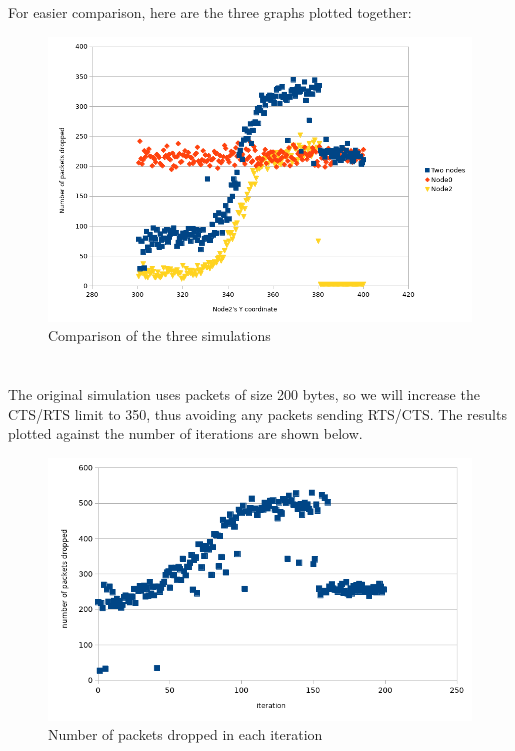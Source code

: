 \documentclass[11pt,journal]{article}
\begin{document}
	For easier comparison, here are the three graphs plotted together:
		\begin{figure}[h]
			\centering
			\includegraphics[scale=0.8]{graphall.png}
			\caption{Comparison of the three simulations}
		\end{figure}
	
	\pagebreak
	\section{}
	The original simulation uses packets of size 200 bytes, so we will increase the CTS/RTS limit to 350, thus avoiding any packets sending RTS/CTS. The results plotted against the number of iterations are shown below.
	
	\begin{figure}[h]
		\centering
		\includegraphics[scale=0.8]{graph5a.png}
		\caption{Number of packets dropped in each iteration}
	\end{figure}
\end{document}
